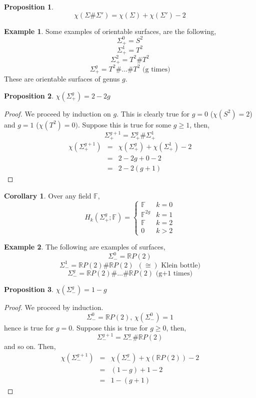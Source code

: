 \documentclass[a4paper,14pt]{extarticle}
\theoremstyle{definition}
\newtheorem*{corollary}{Corollary}
\newtheorem*{proposition}{Proposition}
\newtheorem*{eg}{Example}
\begin{document}
\begin{proposition}
	\[\chi(\Sigma\#\Sigma')=\chi(\Sigma)+\chi(\Sigma')-2\]
\end{proposition}

\begin{eg}
Some examples of orientable surfaces, are the following,
\[\Sigma_+^0=S^2\]\[\Sigma_+^1=T^2\]\[\Sigma_+^2=T^2\#T^2\]\[\Sigma_+^g=T^2\#\ldots\#T^2\text{ (g times)}\] These are orientable surfaces of genus $g$.
\end{eg}

\begin{proposition}
	$\chi(\Sigma_+^g)=2-2g$
\end{proposition}

\begin{proof}
	We proceed by induction on $g$. This is clearly true for $g=0$ ($\chi(S^2)=2$) and 
	$g=1$ ($\chi(T^2)=0)$. Suppose this is true for some $g\geq 1$, then,
	\[\Sigma_+^{g+1}=\Sigma_+^g\#\Sigma_+^1\]
	\begin{eqnarray*}
		\chi(\Sigma_+^{g+1})&=&\chi(\Sigma_+^g)+\chi(\Sigma_+^1)-2 \\
		&=& 2 - 2g + 0 - 2 \\
		&=& 2 - 2(g+1)
	\end{eqnarray*}
\end{proof}

\begin{corollary}
	Over any field $\mathbb{F}$,
	\[H_k(\Sigma_+^g;\mathbb{F})=\begin{cases}
		\mathbb{F} & k = 0 \\ \mathbb{F}^{2g} & k = 1 \\ \mathbb{F} & k = 2 \\ 0 & k>2
	\end{cases}\]
\end{corollary}

\begin{eg}
	The following are examples of  surfaces,
	\[\Sigma_-^0 = \mathbb{R}P(2)\]\[\Sigma_-^1=\mathbb{R}P(2)\#\mathbb{R}P(2)\,\,\, (\cong)\text{ Klein bottle})\]\[\Sigma_-^g=\mathbb{R}P(2)\#\ldots\#\mathbb{R}P(2)
	\text{ (g+1 times)}\]
\end{eg}

\begin{proposition}
	$\chi(\Sigma_-^g)=1-g$
\end{proposition}

\begin{proof}
	We proceed by induction.
	\[\Sigma_-^0=\mathbb{R}P(2), \,\chi(\Sigma_-^0)=1\] hence is true for $g=0$.
	Suppose this is true for $g\geq0$, then,
	\[\Sigma_-^{g+1}=\Sigma_-^g \# \mathbb{R}P(2)\] and so on. Then,
	\begin{eqnarray*}
		\chi(\Sigma_-^{g+1})&=&\chi(\Sigma_-^g)+\chi(\mathbb{R}P(2)) - 2 \\
		&=& (1-g) + 1 - 2 \\
		&=& 1 - (g+1)
	\end{eqnarray*}
\end{proof}
\end{document}

